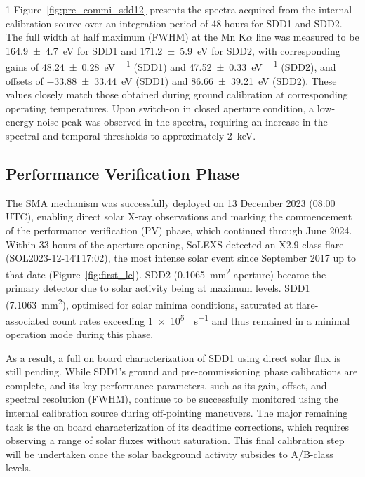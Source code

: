 \documentclass[12pt]{spieman}  %
\begin{document}
\begin{spacing}{1}
Figure~\ref{fig:pre_commi_sdd12} presents the spectra acquired from the internal calibration source over an integration period of \num{48} hours for SDD1 and SDD2. The full width at half maximum (FWHM) at the Mn K$\alpha$ line was measured to be \SI{164.9 \pm 4.7}{\electronvolt} for SDD1 and \SI{171.2 \pm 5.9}{\electronvolt} for SDD2, with corresponding gains of \SI{48.24 \pm 0.28}{\electronvolt\per\channel} (SDD1) and \SI{47.52 \pm 0.33}{\electronvolt\per\channel} (SDD2), and offsets of \SI{-33.88 \pm 33.44}{\electronvolt} (SDD1) and \SI{86.66 \pm 39.21}{\electronvolt} (SDD2). These values closely match those obtained during ground calibration at corresponding operating temperatures.
Upon switch-on in closed aperture condition, a low-energy noise peak was observed in the spectra, requiring an increase in the spectral and temporal thresholds to approximately \SI{2}{\keV}. 


\subsection{Performance Verification Phase}
The SMA mechanism was successfully deployed on 13 December 2023 (08:00 UTC), enabling direct solar X-ray observations and marking the commencement of the performance verification (PV) phase, which continued through June 2024. Within 33 hours of the aperture opening, SoLEXS detected an X2.9-class flare (SOL2023-12-14T17:02), the most intense solar event since September 2017 up to that date (Figure~\ref{fig:first_lc}). SDD2 (\SI{0.1065}{\milli\metre\squared} aperture) became the primary detector due to solar activity being at maximum levels. SDD1 (\SI{7.1063}{\milli\metre\squared}), optimised for solar minima conditions, saturated at flare-associated count rates exceeding \SI{1e5}{\counts\per\second}
and thus remained in a minimal operation mode during this phase.


As a result, a full on board characterization of SDD1 using direct solar flux is still pending.
While SDD1's ground and pre-commissioning phase calibrations are complete, and its key performance parameters, such as its gain, offset, and spectral resolution (FWHM), continue to be successfully monitored using the internal calibration source during off-pointing maneuvers. The major remaining task is the on board characterization of its deadtime corrections, which requires observing a range of solar fluxes without saturation. This final calibration step will be undertaken once the solar background activity subsides to A/B-class levels.




\end{spacing}
\end{document}
